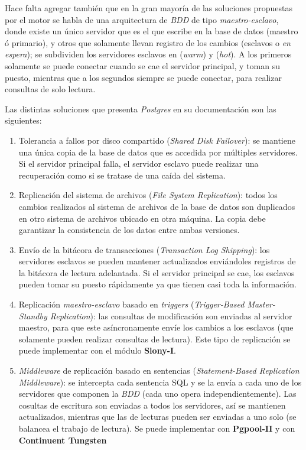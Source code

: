 Hace falta agregar también que en la gran mayoría de las soluciones propuestas por el motor se habla de una arquitectura de \emph{BDD} de tipo \emph{maestro-esclavo}, donde existe un único servidor que es el que escribe en la base de datos (maestro ó primario), y otros que solamente llevan registro de los cambios (esclavos o \emph{en espera}); se subdividen los servidores esclavos en  (\emph{warm}) y  (\emph{hot}). A los primeros solamente se puede conectar cuando se cae el servidor principal, y toman su puesto, mientras que a los segundos siempre se puede conectar, para realizar consultas de solo lectura.

Las distintas soluciones que presenta \emph{Postgres} en su documentación son las siguientes:
\begin{enumerate}
    \item Tolerancia a fallos por disco compartido (\emph{Shared Disk Failover}): se mantiene una única copia de la base de datos que es accedida por múltiples servidores. Si el servidor principal falla, el servidor esclavo puede realizar una recuperación como si se tratase de una caída del sistema.

    \item Replicación del sistema de archivos (\emph{File System Replication}): todos los cambios realizados al sistema de archivos de la base de datos son duplicados en otro sistema de archivos ubicado en otra máquina. La copia debe garantizar la consistencia de los datos entre ambas versiones.

    \item Envío de la bitácora de transacciones (\emph{Transaction Log Shipping}): los servidores esclavos se pueden mantener actualizados enviándoles registros de la bitácora de lectura adelantada. Si el servidor principal se cae, los esclavos pueden tomar su puesto rápidamente ya que tienen casi toda la información.

    \item Replicación \emph{maestro-esclavo} basado en \emph{triggers} (\emph{Trigger-Based Master-Standby Replication}): las consultas de modificación son enviadas al servidor maestro, para que este asíncronamente envíe los cambios a los esclavos (que solamente pueden realizar consultas de lectura). Este tipo de replicación se puede implementar con el módulo \textbf{Slony-I}. 

    \item \emph{Middleware} de replicación basado en sentencias (\emph{Statement-Based Replication Middleware}): se intercepta cada sentencia SQL y se la envía a cada uno de los servidores que componen la \emph{BDD} (cada uno opera independientemente). Las cosultas de escritura son enviadas a todos los servidores, así se mantienen actualizados, mientras que las de lecturas pueden ser enviadas a uno solo (se balancea el trabajo de lectura). Se puede implementar con \textbf{Pgpool-II} y con \textbf{Continuent Tungsten}  


\end{enumerate}
